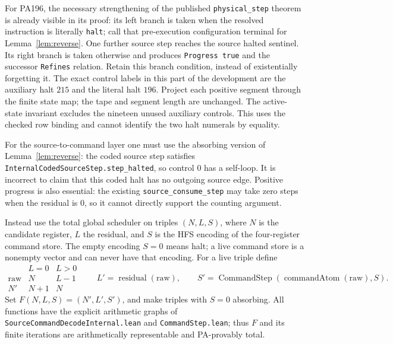 \documentclass[11pt]{article}
\begin{document}
For PA196, the necessary strengthening of the published
\texttt{physical\_step} theorem is already visible in its proof:
its left branch is taken when the resolved instruction is literally
\texttt{halt}; call that pre-execution configuration terminal for
Lemma~\ref{lem:reverse}.  One further source step reaches the source
halted sentinel.  Its right branch is taken otherwise and produces
\texttt{Progress true} and the successor \texttt{Refines} relation.
Retain this branch condition, instead of existentially forgetting it.
The exact control labels in this part of the development are the
auxiliary halt $215$ and the literal halt $196$.  Project each
positive segment through the finite state map; the tape and segment
length are unchanged.  The active-state invariant excludes the
nineteen unused auxiliary controls.  This uses the checked row
binding and cannot identify the two halt numerals by equality.

For the source-to-command layer one must use the absorbing version of
Lemma~\ref{lem:reverse}: the coded source step satisfies
\texttt{InternalCodedSourceStep.step\_halted}, so control $0$ has a
self-loop.  It is incorrect to claim that this coded halt has no
outgoing source edge.  Positive progress is also essential: the
existing \texttt{source\_consume\_step} may take zero steps when the
residual is $0$, so it cannot directly support the counting argument.

Instead use the total global scheduler on triples $(N,L,S)$, where
$N$ is the candidate register, $L$ the residual, and $S$ is the HFS
encoding of the four-register command store.  The empty encoding
$S=0$ means halt; a live command store is a nonempty vector and can
never have that encoding.  For a live triple define
\[
 \begin{array}{c|cc}
       &L=0&L>0\\ \hline
 \mathrm{raw}&N&L-1\\
 N'&N+1&N
 \end{array}
 \qquad
 L'=\operatorname{residual}(\mathrm{raw}),\qquad
 S'=\operatorname{CommandStep}
       (\operatorname{commandAtom}(\mathrm{raw}),S).
\]
Set $F(N,L,S)=(N',L',S')$, and make triples with $S=0$ absorbing.
All functions have the explicit arithmetic graphs of
\texttt{SourceCommandDecodeInternal.lean} and
\texttt{CommandStep.lean}; thus $F$ and its finite iterations are
arithmetically representable and PA-provably total.
\end{document}
